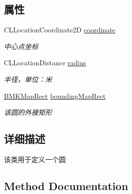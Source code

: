 \subsection*{属性}
\begin{DoxyCompactItemize}
\item 
\hypertarget{interface_b_m_k_circle_a1c516c10dec1971c686e07f814f333f9}{}C\+L\+Location\+Coordinate2\+D \hyperlink{interface_b_m_k_circle_a1c516c10dec1971c686e07f814f333f9}{coordinate}\label{interface_b_m_k_circle_a1c516c10dec1971c686e07f814f333f9}

\begin{DoxyCompactList}\small\item\em 中心点坐标 \end{DoxyCompactList}\item 
\hypertarget{interface_b_m_k_circle_a42507e4c17b4a1c1309fcbe06e370bf5}{}C\+L\+Location\+Distance \hyperlink{interface_b_m_k_circle_a42507e4c17b4a1c1309fcbe06e370bf5}{radius}\label{interface_b_m_k_circle_a42507e4c17b4a1c1309fcbe06e370bf5}

\begin{DoxyCompactList}\small\item\em 半径，单位：米 \end{DoxyCompactList}\item 
\hypertarget{interface_b_m_k_circle_a462a1696e47b1523dd481b22d43bcf46}{}\hyperlink{struct_b_m_k_map_rect}{B\+M\+K\+Map\+Rect} \hyperlink{interface_b_m_k_circle_a462a1696e47b1523dd481b22d43bcf46}{bounding\+Map\+Rect}\label{interface_b_m_k_circle_a462a1696e47b1523dd481b22d43bcf46}

\begin{DoxyCompactList}\small\item\em 该圆的外接矩形 \end{DoxyCompactList}\end{DoxyCompactItemize}


\subsection{详细描述}
该类用于定义一个圆 

\subsection{Method Documentation}
\hypertarget{interface_b_m_k_circle_a82a7234e92fda719b74d6055ee30d360}{}
